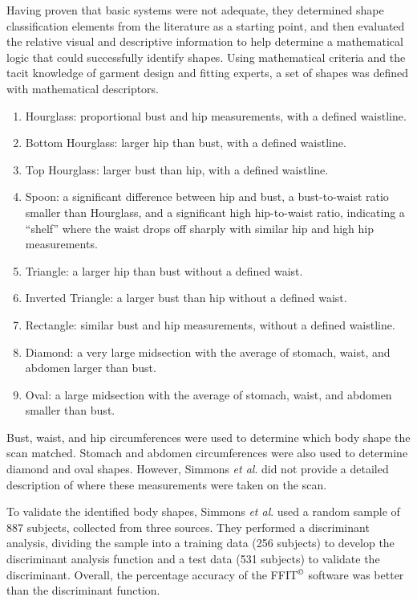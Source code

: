 \documentclass[12pt,a4paper,openany,UKenglish]{scrreprt}
\begin{document}
Having proven that basic systems were not adequate, they determined shape classification elements from the literature as a starting point, and then evaluated the relative visual and descriptive information to help determine a mathematical logic that could successfully identify shapes.
Using mathematical criteria and the tacit knowledge of garment design and fitting experts, a set of shapes was defined with mathematical descriptors.
\begin{enumerate}[nolistsep]
	\item Hourglass: proportional bust and hip measurements, with a defined waistline.
	\item Bottom Hourglass: larger hip than bust, with a defined waistline.
	\item Top Hourglass: larger bust than hip, with a defined waistline.
	\item Spoon: a significant difference between hip and bust, a bust-to-waist ratio smaller than Hourglass, and a significant high hip-to-waist ratio, indicating a “shelf” where the waist drops off sharply with similar hip and high hip measurements.
	\item Triangle: a larger hip than bust without a defined waist.
	\item Inverted Triangle: a larger bust than hip without a defined waist.
	\item Rectangle: similar bust and hip measurements, without a defined waistline.
	\item Diamond: a very large midsection with the average of stomach, waist, and abdomen larger than bust.
	\item Oval: a large midsection with the average of stomach, waist, and abdomen smaller than bust.
\end{enumerate}
Bust, waist, and hip circumferences were used to determine which body shape the scan matched.
Stomach and abdomen circumferences were also used to determine diamond and oval shapes.
However, Simmons \textit{et al}. did not provide a detailed description of where these measurements were taken on the scan.

To validate the identified body shapes, Simmons \textit{et al}. used a random sample of 887 subjects, collected from three sources.
They performed a discriminant analysis, dividing the sample into a training data (256 subjects) to develop the discriminant analysis function and a test data (531 subjects) to validate the discriminant.
Overall, the percentage accuracy of the FFIT$^\text{\copyright}$ software was better than the discriminant function.
\end{document}
